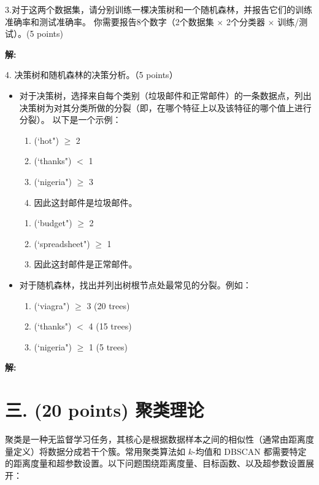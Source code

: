 \documentclass[8pt]{article}
\begin{document}
3.对于这两个数据集，请分别训练一棵决策树和一个随机森林，并报告它们的训练准确率和测试准确率。  
你需要报告8个数字（2个数据集 $\times$ 2个分类器 $\times$ 训练/测试）。(5 points)

\textbf{\large 解:}

\vspace{3em}

4. 决策树和随机森林的决策分析。（5 points）
\begin{itemize}
\item
对于决策树，选择来自每个类别（垃圾邮件和正常邮件）的一条数据点，列出决策树为对其分类所做的分裂（即，在哪个特征上以及该特征的哪个值上进行分裂）。
以下是一个示例：

\begin{enumerate}
    \item (`hot") $\geq$ 2
    \item (`thanks") $<$ 1
    \item (`nigeria") $\geq$ 3
    \item 因此这封邮件是垃圾邮件。
\end{enumerate}

\begin{enumerate}
    \item (`budget") $\geq$ 2
    \item (`spreadsheet") $\geq$ 1
    \item 因此这封邮件是正常邮件。
\end{enumerate}

\item
对于随机森林，找出并列出树根节点处最常见的分裂。例如：

\begin{enumerate}
    \item (`viagra") $\geq$ 3 (20 trees)
    \item (`thanks") $<$ 4 (15 trees)
    \item (`nigeria") $\geq$ 1 (5 trees)
\end{enumerate}

\end{itemize}

\textbf{\large 解:}

\vspace{3em}


\section*{三. (20 points) 聚类理论}

聚类是一种无监督学习任务，其核心是根据数据样本之间的相似性（通常由距离度量定义）将数据分成若干个簇。常用聚类算法如 \( k \)-均值和 DBSCAN 都需要特定的距离度量和超参数设置。以下问题围绕距离度量、目标函数、以及超参数设置展开：  
\end{document}
